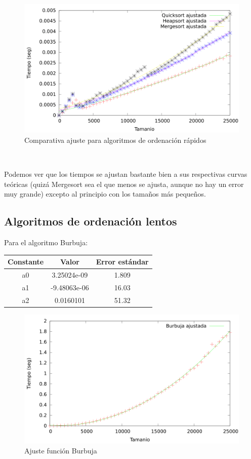 \documentclass{article}
\begin{document}
	
	\begin{figure}[H]
		\centering
		\includegraphics[totalheight=8cm]{img/AlgOrdenacionRapidos_ajustados}
		\caption{Comparativa ajuste para algoritmos de ordenación rápidos}
		\label{fig:AlgOrdenacionRapidos_ajustados}
	\end{figure}

	\
	
	Podemos ver que los tiempos se ajustan bastante bien a sus respectivas curvas teóricas (quizá Mergesort sea el que menos se ajusta, aunque no hay un error muy grande) excepto al principio con los tamaños más pequeños.

	\subsection{Algoritmos de ordenación lentos}


Para el algoritmo Burbuja:

	\begin{longtable}{|c|c|c|}
		\hline
		Constante		& Valor			& Error estándar	\\ \hline
		a0              & 3.25024e-09	& 1.809 \\ \hline
		a1              & -9.48063e-06	& 16.03 \\ \hline
		a2              & 0.0160101		& 51.32 \\ \hline
	\end{longtable}

	\begin{figure}[H]
		\centering
		\includegraphics[totalheight=8cm]{img/Burbuja_ajustada}
		\caption{Ajuste función Burbuja}
		\label{fig:Burbuja_ajustada}
	\end{figure}
\end{document}
